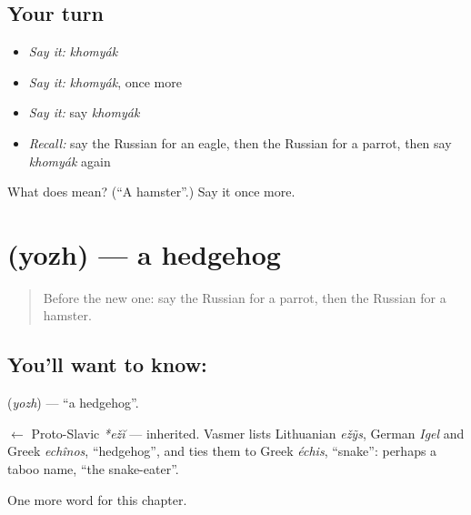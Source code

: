 \subsection*{Your turn}
\begin{itemize}
\raggedright
  \item \emph{Say it:} \emph{khomyák}
  \item \emph{Say it:} \emph{khomyák}, once more
  \item \emph{Say it:} say \emph{khomyák}
  \item \emph{Recall:} say the Russian for an eagle, then the Russian for a parrot, then say \emph{khomyák} again
\end{itemize}

\begin{tcolorbox}[breakable,colback=teal!4,colframe=teal!35!black,title={Before you move on}]
What does  mean? (\textquotedblleft{}A hamster\textquotedblright{}.) Say it once more.
\end{tcolorbox}
\section[\texorpdfstring{\ru{ёж} (yozh)}{ёж (yozh)}]{ (yozh) — a hedgehog}

\label{lesson:RU-C165-yozh}



\begin{quote}
Before the new one: say the Russian for a parrot, then the Russian for a hamster.
\end{quote}

\subsection*{You'll want to know: }
\textbf{} (\emph{yozh}) — \textquotedblleft{}a hedgehog\textquotedblright{}.

\begin{cousinweb}
\textbf{} $\leftarrow$ Proto-Slavic \emph{*ežĭ} — inherited. Vasmer lists Lithuanian \emph{ežỹs}, German \emph{Igel} and Greek \emph{echînos}, \textquotedblleft{}hedgehog\textquotedblright{}, and ties them to Greek \emph{échis}, \textquotedblleft{}snake\textquotedblright{}: perhaps a taboo name, \textquotedblleft{}the snake-eater\textquotedblright{}.
\end{cousinweb}

\begin{grammarlens}[title={What you've built}]
One more word for this chapter.
\end{grammarlens}


